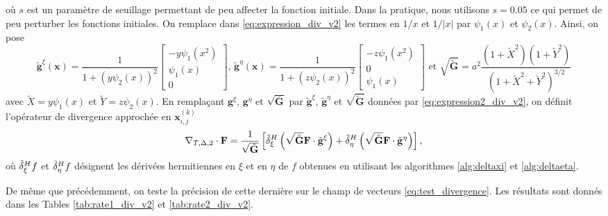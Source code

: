 où $s$ est un paramètre de seuillage permettant de peu affecter la fonction initiale. Dans la pratique, nous utilisons $s=0.05$ ce qui permet de peu perturber les fonctions initiales. On remplace dans \eqref{eq:expression_div_v2} les termes en $1/x$ et $1/|x|$ par $\psi_1(x)$ et $\psi_2(x)$. Ainsi, on pose
\begin{equation}
\tilde{\mathbf{g}}^{\xi} (\mathbf{x} ) = \dfrac{1}{1 + (y\psi_2(x))^2} \begin{bmatrix}
- y\psi_1(x^2) \\
\psi_1(x) \\
0
\end{bmatrix} \text{, }
\tilde{\mathbf{g}}^{\eta} (\mathbf{x} ) = \dfrac{1}{1 + (z\psi_2(x))^2} \begin{bmatrix}
- z\psi_1(x^2) \\
0 \\
\psi_1(x)
\end{bmatrix}
 \text{ et } \sqrt{\tilde{\mathbf{G}}} = a^2 \dfrac{(1+\tilde{X}^2)(1+ \tilde{Y}^2)}{(1+\tilde{X}^2+\tilde{Y}^2)^{3/2}}
\label{eq:expression2_div_v2}
\end{equation}
avec $\tilde{X}=y \psi_1(x)$ et $\tilde{Y} = z \psi_2(x)$.
En remplaçant $\mathbf{g}^{\xi}$, $\mathbf{g}^{\eta}$ et $\sqrt{\bar{\mathbf{G}}}$ par $\tilde{\mathbf{g}}^{\xi}$, $\tilde{\mathbf{g}}^{\eta}$ et $\sqrt{\tilde{\mathbf{G}}}$ données par \eqref{eq:expression2_div_v2}, on définit l'opérateur de divergence approchée en $\mathbf{x}_{i,j}^{(k)}$
\begin{equation}
\nabla_{T,\Delta,2} \cdot \mathbf{F} = \dfrac{1}{\sqrt{\tilde{\mathbf{G}}}} \left[ \tilde{\delta}^H_{\xi} \left( \sqrt{\tilde{\mathbf{G}}} \mathbf{F} \cdot \tilde{\mathbf{g}}^{\xi} \right) + 
\tilde{\delta}^H_{\eta} \left( \sqrt{\tilde{\mathbf{G}}} \mathbf{F} \cdot \tilde{\mathbf{g}}^{\eta} \right)
\right],
\label{eq:div_v2}
\end{equation}
où $\tilde{\delta}^H_{\xi} f$ et $\tilde{\delta}^H_{\eta} f$ désignent les dérivées hermitiennes en $\xi$ et en $\eta$ de $f$ obtenues en utilisant les algorithmes \ref{alg:deltaxi} et \ref{alg:deltaeta}. 

De même que précédemment, on teste la précision de cette dernière sur le champ de vecteurs \eqref{eq:test_divergence}. Les résultats sont donnés dans les Tables \ref{tab:rate1_div_v2} et \ref{tab:rate2_div_v2}.

